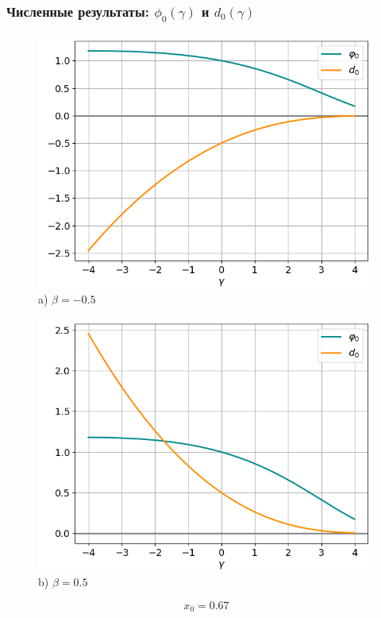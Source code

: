 \documentclass[fullscreen=true, unicode, bookmarks=false]{beamer}
\begin{document}
\begin{frame}
\frametitle{ Численные результаты: $ \phi_0(\gamma) $ и $ d_0(\gamma) $ }

\begin{figure} 
\begin{minipage}[h]{0.49\linewidth}
\begin{center}
\includegraphics[scale=0.34]{divergent_phi0d0_x0=0,67,beta=-0,5.png} \\ {\scriptsize a) $ \beta = -0.5 $}
\end{center}
\end{minipage} 
\hfill
\begin{minipage}[h]{0.49\linewidth}
\begin{center}
\includegraphics[scale=0.34]{divergent_phi0d0_x0=0,67,beta=0,5.png}  \\ {\scriptsize b) $ \beta = 0.5 $}
\end{center}
\end{minipage} 
\end{figure}

$$ x_0 = 0.67 $$

\end{frame}
\end{document}
